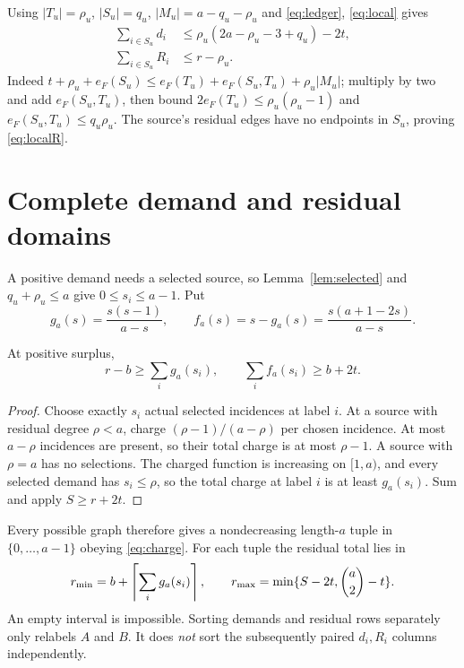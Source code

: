 \documentclass[11pt,a4paper]{article}
\begin{document}
Using $|T_u|=\rho_u$, $|S_u|=q_u$, $|M_u|=a-q_u-\rho_u$ and \eqref{eq:ledger}, \eqref{eq:local} gives
\begin{align}
 \sum_{i\in S_u}d_i&\le\rho_u(2a-\rho_u-3+q_u)-2t,\label{eq:localdegree}\\
 \sum_{i\in S_u}R_i&\le r-\rho_u.\label{eq:localR}
\end{align}
Indeed $t+\rho_u+e_F(S_u)\le e_F(T_u)+e_F(S_u,T_u)+\rho_u|M_u|$; multiply by two and add $e_F(S_u,T_u)$, then bound $2e_F(T_u)\le\rho_u(\rho_u-1)$ and $e_F(S_u,T_u)\le q_u\rho_u$. The source's residual edges have no endpoints in $S_u$, proving \eqref{eq:localR}.

\section{Complete demand and residual domains}\label{sec:domain}
A positive demand needs a selected source, so Lemma~\ref{lem:selected} and $q_u+\rho_u\le a$ give $0\le s_i\le a-1$. Put
\[
 g_a(s)=\frac{s(s-1)}{a-s},\qquad f_a(s)=s-g_a(s)=\frac{s(a+1-2s)}{a-s}.
\]
\begin{lemma}[Charging]\label{lem:charge}
At positive surplus,
\begin{equation}\label{eq:charge}
 r-b\ge\sum_i g_a(s_i),\qquad \sum_i f_a(s_i)\ge b+2t.
\end{equation}
\end{lemma}
\begin{proof}
Choose exactly $s_i$ actual selected incidences at label $i$. At a source with residual degree $\rho<a$, charge $(\rho-1)/(a-\rho)$ per chosen incidence. At most $a-\rho$ incidences are present, so their total charge is at most $\rho-1$. A source with $\rho=a$ has no selections. The charged function is increasing on $[1,a)$, and every selected demand has $s_i\le\rho$, so the total charge at label $i$ is at least $g_a(s_i)$. Sum and apply $S\ge r+2t$.
\end{proof}
Every possible graph therefore gives a nondecreasing length-$a$ tuple in $\{0,\ldots,a-1\}$ obeying \eqref{eq:charge}. For each tuple the residual total lies in
\begin{equation}\label{eq:rinterval}
 r_{\min}=b+\left\lceil\sum_i g_a(s_i)\right\rceil,\qquad
 r_{\max}=\min\{S-2t,\binom a2-t\}.
\end{equation}
An empty interval is impossible. Sorting demands and residual rows separately only relabels $A$ and $B$. It does \emph{not} sort the subsequently paired $d_i,R_i$ columns independently.
\end{document}
